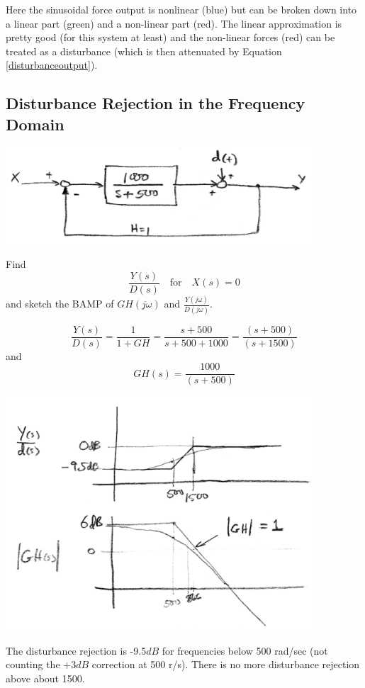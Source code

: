 \begin{Example}
Here the sinusoidal force output is nonlinear (blue) but can be broken down into a linear part (green) and a non-linear part (red). The linear approximation is pretty good (for this system at least) and the non-linear forces (red) can be treated as a disturbance (which is then attenuated by Equation \ref{disturbanceoutput}).

\end{Example}
 

\subsection{Disturbance Rejection in the Frequency Domain}


\begin{ExampleSmall}

\includegraphics[width=4.5in]{figs06/00774a.png}

Find
\[
\frac{Y(s)}{D(s)} \quad \mathrm{for} \quad  X(s) = 0
\]
and sketch the BAMP of $GH(j\omega)$ and $\frac{Y(j\omega)}{D(j\omega)}$.

\vspace{0.25in}

\[
\frac{Y(s)}{D(s)} = \frac{1}{1+GH} =  \frac  {s+500}  {s+500 + 1000} = \frac{(s+500)}{(s+1500)}
\]
and
\[
GH(s) = \frac{1000}{(s+500)}
\]


\includegraphics[width=4.5in]{figs06/00775a.png}


The disturbance rejection is -9.5$dB$ for frequencies below 500 rad/sec (not counting the +3$dB$ correction at 500 r/s).   There is no more disturbance rejection above about 1500.

\end{ExampleSmall}

